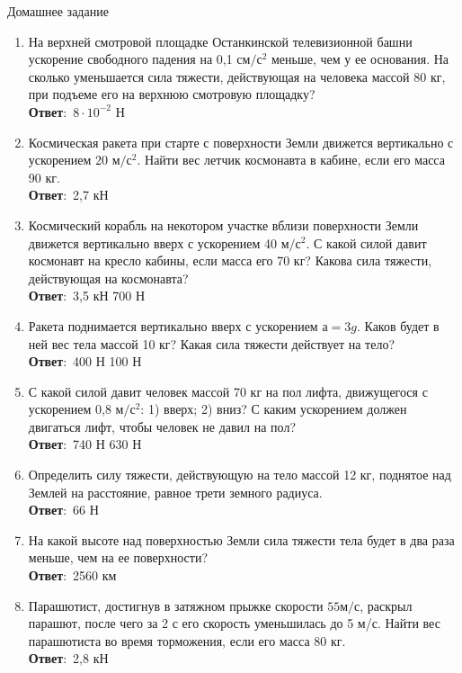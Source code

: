 \documentclass[a5paper, 10pt]{diss_4}
\renewcommand{\'}{\,'}
\begin{document}
\begin{center}
   Домашнее задание
\end{center}
\begin{enumerate}

\item На верхней смотровой площадке Останкинской телевизионной башни ускорение свободного падения на 0,1 $см/с^2$ меньше, чем у ее основания. На сколько уменьшается сила тяжести, действующая на человека массой 80 кг, при подъеме его на верхнюю смотровую площадку?
\\\textbf{Ответ}:\ $8\cdot10^{-2}$ Н

\item Космическая ракета при старте с поверхности Земли движется вертикально с ускорением 20 $м/с^2$. Найти вес летчик космонавта в кабине, если его масса 90 кг.
\\\textbf{Ответ}:\ 2,7 кН

\item Космический корабль на некотором участке вблизи поверхности Земли движется вертикально вверх с ускорением 40 $м/с^2$. С какой силой давит космонавт на кресло кабины, если масса его 70 кг? Какова сила тяжести, действующая на космонавта?
\\\textbf{Ответ}:\ 3,5 кН   700 Н

\item Ракета поднимается вертикально вверх с ускорением $а = 3g$. Каков будет в ней вес тела массой 10 кг? Какая сила тяжести действует на тело?
\\\textbf{Ответ}:\ 400 Н    100 Н

\item С какой силой давит человек массой 70 кг на пол лифта, движущегося с ускорением 0,8 $м/с^2$: 1) вверх; 2) вниз? С каким ускорением должен двигаться лифт, чтобы человек не давил на пол?
\\\textbf{Ответ}:\ 740 Н    630 Н

\item Определить силу тяжести, действующую на тело массой 12 кг, поднятое над Землей на расстояние, равное трети земного радиуса.
\\\textbf{Ответ}:\ 66 Н

\item На какой высоте над поверхностью Земли сила тяжести тела будет в два раза меньше, чем на ее поверхности?
\\\textbf{Ответ}:\ 2560 км

\item Парашютист, достигнув в затяжном прыжке скорости $55 м/с$, раскрыл парашют, после чего за 2 с его скорость уменьшилась до 5 м/с. Найти вес парашютиста во время торможения, если его масса 80 кг.
\\\textbf{Ответ}:\ 2,8 кН
\end{enumerate}
\end{document}
